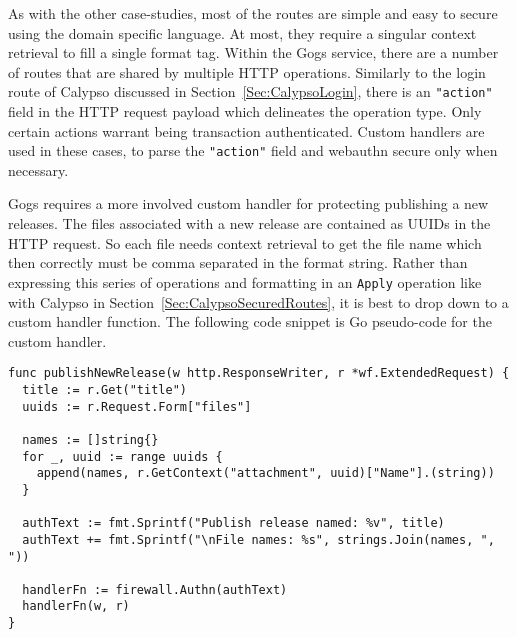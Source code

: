 As with the other case-studies, most of the routes are simple and easy to secure using the domain specific language. At most, they require a singular context retrieval to fill a single format tag. Within the Gogs service, there are a number of routes that are shared by multiple HTTP operations. Similarly to the login route of Calypso discussed in Section~\ref{Sec:CalypsoLogin}, there is an \lstinline{"action"} field in the HTTP request payload which delineates the operation type. Only certain actions warrant being transaction authenticated. Custom handlers are used in these cases, to parse the \lstinline{"action"} field and webauthn secure only when necessary.

Gogs requires a more involved custom handler for protecting publishing a new releases. The files associated with a new release are contained as UUIDs in the HTTP request. So each file needs context retrieval to get the file name which then correctly must be comma separated in the format string. Rather than expressing this series of operations and formatting in an \lstinline{Apply} operation like with Calypso in Section~\ref{Sec:CalypsoSecuredRoutes}, it is best to drop down to a custom handler function. The following code snippet is Go pseudo-code for the custom handler.

\begin{lstlisting}
func publishNewRelease(w http.ResponseWriter, r *wf.ExtendedRequest) {
  title := r.Get("title")
  uuids := r.Request.Form["files"]

  names := []string{}
  for _, uuid := range uuids {
    append(names, r.GetContext("attachment", uuid)["Name"].(string))
  }

  authText := fmt.Sprintf("Publish release named: %v", title)
  authText += fmt.Sprintf("\nFile names: %s", strings.Join(names, ", "))

  handlerFn := firewall.Authn(authText)
  handlerFn(w, r)
}
\end{lstlisting}


